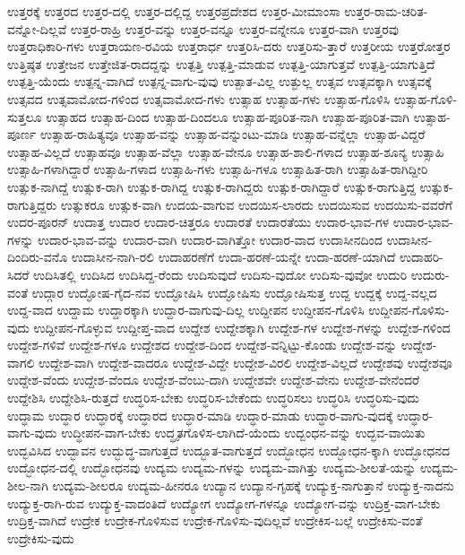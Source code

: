 {ಉತ್ತರಕ್ಕೆ
ಉತ್ತರದ
ಉತ್ತರ-ದಲ್ಲಿ
ಉತ್ತರ-ದಲ್ಲಿದ್ದ
ಉತ್ತರಪ್ರದೇಶದ
ಉತ್ತರ-ಮೀಮಾಂಸಾ
ಉತ್ತರ-ರಾಮ-ಚರಿತ-ವನ್ನೋ-ದಿಲ್ಲವೆ
ಉತ್ತರ-ರಾಹ್ರಿ
ಉತ್ತರ-ವನ್ನು
ಉತ್ತರ-ವನ್ನೂ
ಉತ್ತರ-ವನ್ನೇನೂ
ಉತ್ತರ-ವಾಗಿ
ಉತ್ತರವು
ಉತ್ತರಾಧಿಕಾರಿ-ಗಳು
ಉತ್ತರಾಯಣ-ರವಿಯ
ಉತ್ತರಾರ್ಧ
ಉತ್ತರಿಸಿ-ದರು
ಉತ್ತರಿಸು-ತ್ತಾರೆ
ಉತ್ತರೀಯ
ಉತ್ತರೋತ್ತರ
ಉತ್ತಿಷ್ಠತ
ಉತ್ತೇಜನ
ಉತ್ತೇಜಿತ-ರಾದದ್ದನ್ನು
ಉತ್ಪತ್ತಿ
ಉತ್ಪತ್ತಿ-ಮಾಡುವ
ಉತ್ಪತ್ತಿ-ಯಾಗುತ್ತವೆ
ಉತ್ಪತ್ತಿ-ಯಾಗುತ್ತಿದೆ
ಉತ್ಪತ್ತಿ-ಯೆಂದು
ಉತ್ಪನ್ನ-ವಾಗಿದೆ
ಉತ್ಪನ್ನ-ವಾಗು-ವುವು
ಉತ್ಪಾತ-ವಿಲ್ಲ
ಉತ್ಫುಲ್ಲ
ಉತ್ಸವ
ಉತ್ಸವಕ್ಕಾಗಿ
ಉತ್ಸವಕ್ಕೆ
ಉತ್ಸವದ
ಉತ್ಸವಾಮೋದ-ಗಳಿಂದ
ಉತ್ಸವಾಮೋದ-ಗಳು
ಉತ್ಸಾಹ
ಉತ್ಸಾಹ-ಗಳು
ಉತ್ಸಾಹ-ಗೊಳಿಸಿ
ಉತ್ಸಾಹ-ಗೊಳಿ-ಸುತ್ತಲೂ
ಉತ್ಸಾಹದ
ಉತ್ಸಾಹ-ದಿಂದ
ಉತ್ಸಾಹ-ದಿಂದಲೂ
ಉತ್ಸಾಹ-ಪೂರಿತ-ನಾಗಿ
ಉತ್ಸಾಹ-ಪೂರಿತ-ವಾಗಿ
ಉತ್ಸಾಹ-ಪೂರ್ಣ
ಉತ್ಸಾಹ-ರಾಹಿತ್ಯವೂ
ಉತ್ಸಾಹ-ವನ್ನು
ಉತ್ಸಾಹ-ವನ್ನುಂಟು-ಮಾಡಿ
ಉತ್ಸಾಹ-ವನ್ನೆಲ್ಲಾ
ಉತ್ಸಾಹ-ವಿದ್ದರೆ
ಉತ್ಸಾಹ-ವಿಲ್ಲದೆ
ಉತ್ಸಾಹವೂ
ಉತ್ಸಾಹ-ವೆಲ್ಲಾ
ಉತ್ಸಾಹ-ವೇನೂ
ಉತ್ಸಾಹ-ಶಾಲಿ-ಗಳಾದ
ಉತ್ಸಾಹ-ಶೂನ್ಯ
ಉತ್ಸಾಹಿ
ಉತ್ಸಾಹಿ-ಗಳಾಗಿದ್ದಾರೆ
ಉತ್ಸಾಹಿ-ಗಳಾದ
ಉತ್ಸಾಹಿ-ಗಳು
ಉತ್ಸಾಹಿ-ಗಳೂ
ಉತ್ಸಾಹಿತ-ರಾಗಿ
ಉತ್ಸಾಹಿತ-ರಾಗಿದ್ದೀರಿ
ಉತ್ಸುಕ-ನಾಗಿದ್ದೆ
ಉತ್ಸುಕ-ರಾಗಿ
ಉತ್ಸುಕ-ರಾಗಿದ್ದ
ಉತ್ಸುಕ-ರಾಗಿದ್ದರು
ಉತ್ಸುಕ-ರಾಗಿದ್ದಾರೆ
ಉತ್ಸುಕ-ರಾಗುತ್ತಿದ್ದ
ಉತ್ಸುಕ-ರಾಗುತ್ತಿದ್ದರು
ಉತ್ಸುಕರೂ
ಉತ್ಸುಕ-ವಾಗಿ
ಉದಯ-ವಾಗುವ
ಉದಯಿಸ-ಲಾರದು
ಉದಯಿಸುವ
ಉದಯಿಸು-ವವರೆಗೆ
ಉದರ-ಪೂರನ್
ಉದಾತ್ತ
ಉದಾರ
ಉದಾರ-ಚಿತ್ತರೂ
ಉದಾರತೆ
ಉದಾರತೆಯು
ಉದಾರ-ಭಾವ-ಗಳ
ಉದಾರ-ಭಾವ-ಗಳನ್ನು
ಉದಾರ-ಭಾವ-ವನ್ನು
ಉದಾರ-ವಾಗಿ
ಉದಾರ-ವಾಗಿತ್ತೋ
ಉದಾರ-ವಾದ
ಉದಾಸೀನದಿಂದ
ಉದಾಸೀನ-ದಿಂದಿರು-ವನೊ
ಉದಾಸೀನ-ನಾಗಿ-ರಲಿ
ಉದಾಹರಣೆಗೆ
ಉದಾ-ಹರಣೆ-ಯನ್ನೇ
ಉದಾ-ಹರಣೆ-ಯಾಗಿದೆ
ಉದಾಹರಿ-ಸಿದರೆ
ಉದಿಸಿತಲ್ಲಿ
ಉದಿಸಿದ
ಉದಿಸಿದ್ದ-ರೆಂದು
ಉದಿಸುವುದೆ
ಉದಿಸು-ವುದೋ
ಉದಿಸು-ವುವೋ
ಉದುರಿ
ಉದುರು-ವಂತೆ
ಉದ್ಗಾರ
ಉದ್ಘೋಷ-ಗೈದ-ನವ
ಉದ್ಘೋಷಿಸಿ
ಉದ್ಘೋಷಿಸು
ಉದ್ಘೋಷಿಸುತ್ತ
ಉದ್ದ
ಉದ್ದಕ್ಕೆ
ಉದ್ದ-ವಲ್ಲದ
ಉದ್ದ-ವಾದ
ಉದ್ದಾಮ
ಉದ್ದಾರಕ್ಕಾಗಿ
ಉದ್ದಾರ-ವಾಗುವು-ದಿಲ್ಲ
ಉದ್ದೀಪನ
ಉದ್ದೀಪನ-ಗೊಳಿಸಿ
ಉದ್ದೀಪನ-ಗೊಳಿಸು-ವುದು
ಉದ್ದೀಪನ-ಗೊಳ್ಳುವ
ಉದ್ದೀಪ್ತ-ವಾದ
ಉದ್ದೇಶ
ಉದ್ದೇಶಕ್ಕಾಗಿ
ಉದ್ದೇಶ-ಗಳ
ಉದ್ದೇಶ-ಗಳನ್ನು
ಉದ್ದೇಶ-ಗಳಿಂದ
ಉದ್ದೇಶ-ಗಳಿವೆ
ಉದ್ದೇಶ-ಗಳೂ
ಉದ್ದೇಶದ
ಉದ್ದೇಶ-ದಿಂದ
ಉದ್ದೇಶ-ವನ್ನಿಟ್ಟು-ಕೊಂಡು
ಉದ್ದೇಶ-ವನ್ನು
ಉದ್ದೇಶ-ವಾಗಲಿ
ಉದ್ದೇಶ-ವಾಗಿ
ಉದ್ದೇಶ-ವಾದರೂ
ಉದ್ದೇಶ-ವಿದ್ದೇ
ಉದ್ದೇಶ-ವಿರಲಿ
ಉದ್ದೇಶ-ವಿಲ್ಲದೆ
ಉದ್ದೇಶವು
ಉದ್ದೇಶವೂ
ಉದ್ದೇಶ-ವೆಂದು
ಉದ್ದೇಶ-ವೆಂದೂ
ಉದ್ದೇಶ-ವೆಂಬು-ದಾಗಿ
ಉದ್ದೇಶವೇ
ಉದ್ದೇಶ-ವೇನು
ಉದ್ದೇಶ-ವೇನೆಂದರೆ
ಉದ್ದೇಶಿಸಿ
ಉದ್ದೇಶಿಸಿ-ರುತ್ತದೆ
ಉದ್ಧರಿಸ-ಬೇಕು
ಉದ್ಧರಿಸ-ಬೇಕೆಂದು
ಉದ್ಧರಿಸಲು
ಉದ್ಧರಿಸಿ
ಉದ್ಧರಿಸು-ವುದು
ಉದ್ಧಾಮ
ಉದ್ಧಾರ
ಉದ್ಧಾರಕ್ಕೆ
ಉದ್ಧಾರದ
ಉದ್ಧಾರ-ಮಾಡಿ
ಉದ್ಧಾರ-ಮಾಡು
ಉದ್ಧಾರ-ವಾಗು-ವುದಕ್ಕೆ
ಉದ್ಧಾರ-ವಾಗು-ವುದು
ಉದ್ಧೀಪನ-ವಾಗ-ಬೇಕು
ಉದ್ಧೃತಗೊಳಿಸ-ಲಾಗಿದೆ-ಯೆಂದು
ಉದ್ಬಂಧನ-ವನ್ನು
ಉದ್ಭವ-ವಾಯಿತು
ಉದ್ಭವಿಸಿದ
ಉದ್ಭಾವನ
ಉದ್ಭುದ್ಧ-ವಾಗುತ್ತದೆ
ಉದ್ಭೂತ-ವಾಗುತ್ತದೆ
ಉದ್ಭೋಧನ
ಉದ್ಭೋಧನ-ಕ್ಕಾಗಿ
ಉದ್ಭೋಧನದ
ಉದ್ಭೋಧನ-ದಲ್ಲಿ
ಉದ್ಭೋಧನವು
ಉದ್ಯಮ
ಉದ್ಯಮ-ಗಳನ್ನು
ಉದ್ಯಮ-ವಾಗಿತ್ತು
ಉದ್ಯಮ-ಶೀಲತೆ-ಯನ್ನು
ಉದ್ಯಮ-ಶೀಲ-ನಾಗಿ
ಉದ್ಯಮ-ಶೀಲರೂ
ಉದ್ಯಮ-ಹೀನರೂ
ಉದ್ಯಾನ
ಉದ್ಯಾನ-ಗೃಹಕ್ಕೆ
ಉದ್ಯುಕ್ತ-ನಾಗುತ್ತಾನೆ
ಉದ್ಯುಕ್ತ-ನಾದನು
ಉದ್ಯುಕ್ತ-ರಾಗಿ-ರುವ
ಉದ್ಯುಕ್ತ-ವಾದಂತಿದೆ
ಉದ್ಯೋಗ
ಉದ್ಯೋಗ-ಗಳನ್ನೂ
ಉದ್ಯೋಗ-ವನ್ನು
ಉದ್ರಿಕ್ತ-ವಾಗ-ಬೇಕು
ಉದ್ರಿಕ್ತ-ವಾಗಿದೆ
ಉದ್ರೇಕ
ಉದ್ರೇಕ-ಗೊಳಿಸುವ
ಉದ್ರೇಕ-ಗೊಳಿಸು-ವುದಿಲ್ಲವೆ
ಉದ್ರೇಕಿಸ-ಬಲ್ಲೆ
ಉದ್ರೇಕಿಸು-ವಂತೆ
ಉದ್ರೇಕಿಸು-ವುದು
}
